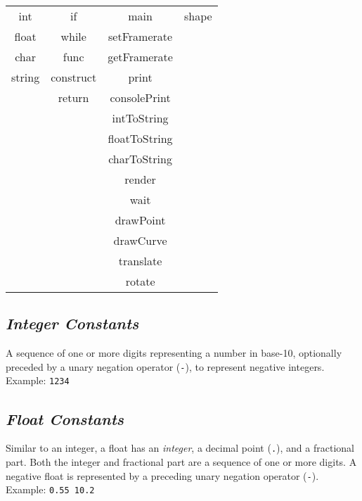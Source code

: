         \begin{center}
            \begin{tabular}{ |c|c|c|c| } 
            \hline
                int     & if            & main          & shape   \\ 
                float   & while         & setFramerate  & \\ 
                char    & func          & getFramerate  & \\
                string  & construct     & print         & \\
                        & return        & consolePrint  & \\
                        &               & intToString   & \\
                        &               & floatToString & \\
                        &               & charToString  & \\
                        &               & render        & \\
                        &               & wait          & \\
                        &               & drawPoint     & \\
                        &               & drawCurve     & \\
                        &               & translate     & \\
                        &               & rotate        & \\

            \hline
            \end{tabular}
        \end{center}

    \subsection{\textit{Integer Constants}}
    A sequence of one or more digits representing a number in base-10, optionally preceded by a unary negation operator (\texttt{-}), to represent negative integers.\\
    Example: \texttt{1234}

    \subsection{\textit{Float Constants}}
    Similar to an integer, a float has an \textit{integer}, a decimal point (\texttt{.}), and a fractional part. Both the integer and fractional part are a sequence of one or more digits. A negative float is represented by a preceding unary negation operator (\texttt{-}).\\
    Example: \texttt{0.55  10.2}

